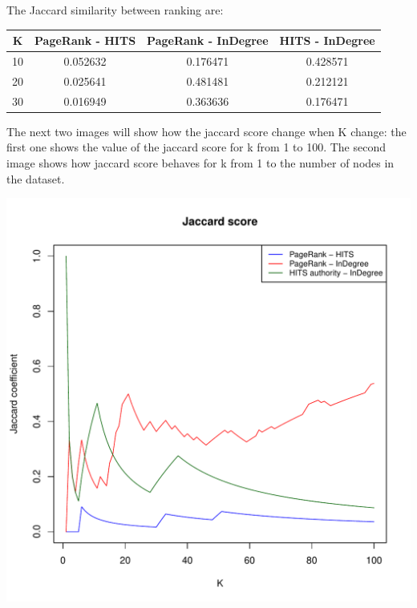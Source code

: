\documentclass[10pt]{article}
\begin{document}
The Jaccard similarity between ranking are:

\begin{tabular}{||c c c c||} 
    \hline
    K & PageRank - HITS & PageRank - InDegree & HITS - InDegree \\ [0.5ex] 
    \hline\hline
    10 & 0.052632 & 0.176471 & 0.428571 \\
    20 & 0.025641 & 0.481481 & 0.212121 \\
    30 & 0.016949 & 0.363636 & 0.176471 \\ [1ex] 
    \hline
\end{tabular}

The next two images will show how the jaccard score change when K change: the first one shows the value of the jaccard score for k from 1 to 100. The second image shows how jaccard score behaves for k from 1 to the number of nodes in the dataset.

\includegraphics[scale=0.8]{img/jaccard-100.pdf}
\end{document}
